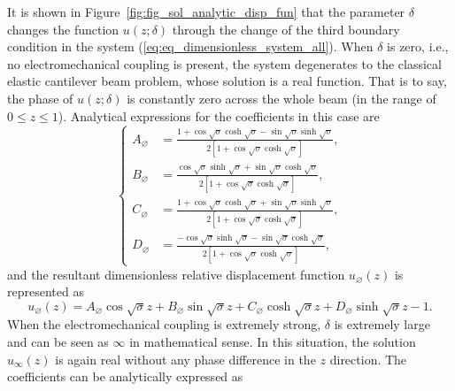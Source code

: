 \documentclass{svjour3}                     %
\begin{document}
It is shown in Figure~\ref{fig:fig_sol_analytic_disp_fun} that the parameter $\delta$ changes the function $u(z;\delta)$ through the change of the third boundary condition in the system (\ref{eq:eq_dimensionless_system_all}). When $\delta$ is zero, i.e., no electromechanical coupling is present, the system degenerates to the classical elastic cantilever beam problem, whose solution is a real function. That is to say, the phase of $u(z;\delta)$ is constantly zero across the whole beam (in the range of $0 \leq z \leq 1$).
Analytical expressions for the coefficients in this case are 
\begin{equation}
    \left\{\begin{aligned}
        A_{\varnothing} &= \frac{ 1 + \cos\sqrt{\sigma } \cosh\sqrt{\sigma } - \sin\sqrt{\sigma } \sinh\sqrt{\sigma} }{2 \left[ 1 + \cos\sqrt{\sigma } \cosh\sqrt{\sigma } \right]}, \\
        B_{\varnothing} &= \frac{ \cos\sqrt{\sigma } \sinh\sqrt{\sigma } + \sin\sqrt{\sigma } \cosh\sqrt{\sigma} }{2 \left[ 1 + \cos\sqrt{\sigma } \cosh\sqrt{\sigma } \right]}, \\
        C_{\varnothing} &= \frac{ 1 + \cos\sqrt{\sigma } \cosh\sqrt{\sigma } + \sin\sqrt{\sigma } \sinh\sqrt{\sigma} }{2 \left[ 1 + \cos\sqrt{\sigma } \cosh\sqrt{\sigma } \right]}, \\
        D_{\varnothing} &= \frac{ -\cos\sqrt{\sigma } \sinh\sqrt{\sigma } - \sin\sqrt{\sigma } \cosh\sqrt{\sigma} }{2 \left[ 1 + \cos\sqrt{\sigma } \cosh\sqrt{\sigma } \right]},
    \end{aligned}\right.
    \label{eq:eq_disp_func_coeffs_exps_zero}
\end{equation}
and the resultant dimensionless relative displacement function $u_{\varnothing} (z)$ is represented as
\begin{equation}
    u_{\varnothing} (z) = A_{\varnothing} \cos{\sqrt{\sigma}z} + B_{\varnothing} \sin{\sqrt{\sigma}z} + C_{\varnothing} \cosh{\sqrt{\sigma}z} + D_{\varnothing} \sinh{\sqrt{\sigma}z} - 1.
\end{equation}
When the electromechanical coupling is extremely strong, $\delta$ is extremely large and can be seen as $\infty$ in mathematical sense. In this situation, the solution $u_\infty (z)$ is again real without any phase difference in the $z$ direction. The coefficients can be analytically expressed as 
\end{document}
